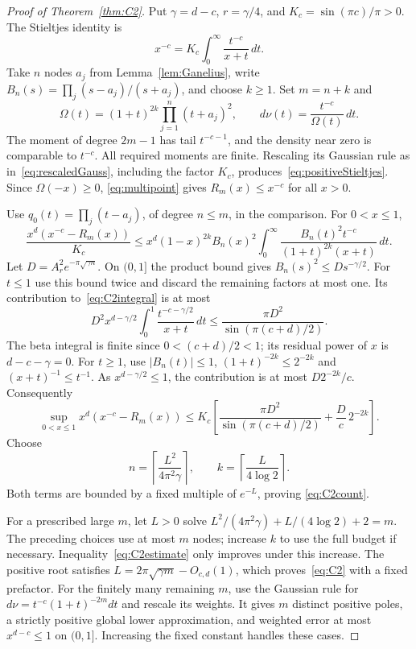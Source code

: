 \documentclass[11pt]{article}
\numberwithin{equation}{section}
\begin{document}
\begin{proof}[Proof of Theorem~\ref{thm:C2}]
Put $\gamma=d-c$, $r=\gamma/4$, and $K_c=\sin(\pi c)/\pi>0$. The
Stieltjes identity is
\begin{equation}\label{eq:powerStieltjes}
 x^{-c}=K_c\int_0^\infty\frac{t^{-c}}{x+t}\,dt.
\end{equation}
Take $n$ nodes $a_j$ from Lemma~\ref{lem:Ganelius}, write
$B_n(s)=\prod_j(s-a_j)/(s+a_j)$, and choose $k\ge1$. Set $m=n+k$ and
\[
 \Omega(t)=(1+t)^{2k}\prod_{j=1}^n(t+a_j)^2,
 \qquad d\nu(t)=\frac{t^{-c}}{\Omega(t)}\,dt.
\]
The moment of degree $2m-1$ has tail $t^{-c-1}$, and the density
near zero is comparable to $t^{-c}$. All required moments are finite.
Rescaling its Gaussian rule as in~\eqref{eq:rescaledGauss}, including
the factor $K_c$, produces~\eqref{eq:positiveStieltjes}. Since
$\Omega(-x)\ge0$, \eqref{eq:multipoint} gives $R_m(x)\le x^{-c}$
for all $x>0$.

Use $q_0(t)=\prod_j(t-a_j)$, of degree $n\le m$, in the comparison.
For $0<x\le1$,
\begin{equation}\label{eq:C2integral}
 \frac{x^d(x^{-c}-R_m(x))}{K_c}
 \le x^d(1-x)^{2k}B_n(x)^2
      \int_0^\infty\frac{B_n(t)^2t^{-c}}{(1+t)^{2k}(x+t)}\,dt.
\end{equation}
Let $D=A_r^2e^{-\pi\sqrt{\gamma n}}$. On $(0,1]$ the product bound
gives $B_n(s)^2\le D s^{-\gamma/2}$.
For $t\le1$ use this bound twice and discard the remaining factors
at most one. Its contribution to~\eqref{eq:C2integral} is at most
\[
 D^2x^{d-\gamma/2}\int_0^1\frac{t^{-c-\gamma/2}}{x+t}\,dt
       \le\frac{\pi D^2}{\sin(\pi(c+d)/2)}.
\]
The beta integral is finite since $0<(c+d)/2<1$; its residual power
of $x$ is $d-c-\gamma=0$. For $t\ge1$, use $|B_n(t)|\le1$,
$(1+t)^{-2k}\le2^{-2k}$ and $(x+t)^{-1}\le t^{-1}$.
As $x^{d-\gamma/2}\le1$, the contribution is at most $D2^{-2k}/c$.
Consequently
\begin{equation}\label{eq:C2estimate}
 \sup_{0<x\le1}x^d(x^{-c}-R_m(x))
 \le K_c\left[\frac{\pi D^2}{\sin(\pi(c+d)/2)}
                                     +\frac Dc\,2^{-2k}\right].
\end{equation}
Choose
\[
 n=\left\lceil\frac{L^2}{4\pi^2\gamma}\right\rceil,
 \qquad k=\left\lceil\frac{L}{4\log2}\right\rceil.
\]
Both terms are bounded by a fixed multiple of $e^{-L}$, proving
\eqref{eq:C2count}.

For a prescribed large $m$, let $L>0$ solve
$L^2/(4\pi^2\gamma)+L/(4\log2)+2=m$.
The preceding choices use at most $m$ nodes; increase $k$ to use
the full budget if necessary. Inequality~\eqref{eq:C2estimate} only
improves under this increase. The positive root satisfies
$L=2\pi\sqrt{\gamma m}-O_{c,d}(1)$, which proves~\eqref{eq:C2} with
a fixed prefactor. For the finitely many remaining $m$, use the
Gaussian rule for $d\nu=t^{-c}(1+t)^{-2m}dt$ and rescale its weights.
It gives $m$ distinct positive poles, a strictly positive global lower
approximation, and weighted error at most $x^{d-c}\le1$ on $(0,1]$.
Increasing the fixed constant handles these cases.
\end{proof}
\end{document}
